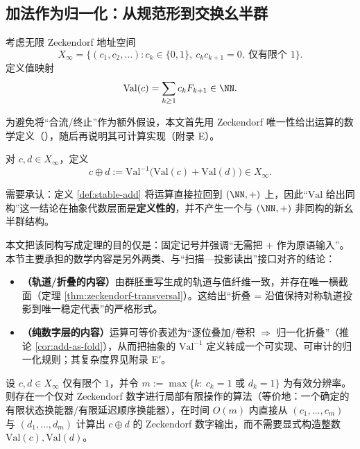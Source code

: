 \subsection{加法作为归一化：从规范形到交换幺半群}

考虑无限 Zeckendorf 地址空间
\[
X_\infty=\{(c_1,c_2,\dots): c_k\in\{0,1\},\ c_kc_{k+1}=0,\ \text{仅有限个 }1\}.
\]
定义值映射
\[
\mathrm{Val}(c)=\sum_{k\ge1}c_kF_{k+1}\in\NN.
\]

为避免将“合流/终止”作为额外假设，本文首先用 Zeckendorf 唯一性给出运算的数学定义（\cite{Zeckendorf1972}），随后再说明其可计算实现（附录 E）。

\begin{definition}[稳定加法]\label{def:stable-add}
对 $c,d\in X_\infty$，定义
\[
c\oplus d:=\mathrm{Val}^{-1}\bigl(\mathrm{Val}(c)+\mathrm{Val}(d)\bigr)\in X_\infty.
\]
\end{definition}

\begin{remark}\label{rem:arith-not-novel-as-abstract}
需要承认：定义 \ref{def:stable-add} 将运算直接拉回到 $(\NN,+)$ 上，因此“\(\mathrm{Val}\) 给出同构”这一结论在抽象代数层面是\textbf{定义性的}，并不产生一个与 \((\NN,+)\) 非同构的新幺半群结构。

本文把该同构写成定理的目的仅是：固定记号并强调“无需把 \(+\) 作为原语输入”。本节主要承担的数学内容是另外两类、与“扫描—投影读出”接口对齐的结论：
\begin{itemize}
  \item \textbf{（轨道/折叠的内容）}由群胚重写生成的轨道与值纤维一致，并存在唯一横截面（定理 \ref{thm:zeckendorf-transversal}）。这给出“折叠 = 沿值保持对称轨道投影到唯一稳定代表”的严格形式。
  \item \textbf{（纯数字层的内容）}运算可等价表述为“逐位叠加/卷积 $\Rightarrow$ 归一化折叠”（推论 \ref{cor:add-as-fold}），从而把抽象的 \(\mathrm{Val}^{-1}\) 定义转成一个可实现、可审计的归一化规则；其复杂度界见附录 E$'$。
\end{itemize}
\end{remark}

\begin{theorem}\label{thm:zeckendorf-add-fst}
设 $c,d\in X_\infty$ 仅有限个 $1$，并令
\(
m:=\max\{k:\ c_k=1\text{ 或 }d_k=1\}
\)
为有效分辨率。则存在一个仅对 Zeckendorf 数字进行局部有限操作的算法（等价地：一个确定的有限状态换能器/有限延迟顺序换能器），在时间 $O(m)$ 内直接从 $(c_1,\dots,c_m)$ 与 $(d_1,\dots,d_m)$ 计算出 $c\oplus d$ 的 Zeckendorf 数字输出，而不需要显式构造整数 $\mathrm{Val}(c),\mathrm{Val}(d)$。
\end{theorem}

